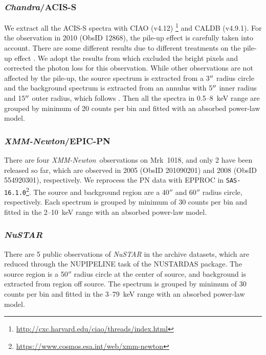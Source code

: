 \documentclass[twocolumn]{aastex63}
\newcommand{\xmm}{{\em XMM-Newton}}
\newcommand{\nustar}{{\em NuSTAR }}
\newcommand{\chandra}{{\em Chandra}}
\begin{document}
\subsubsection{\chandra/ACIS-S}
We extract all the ACIS-S spectra with CIAO (v4.12) \footnote{\url{http://cxc.harvard.edu/ciao/threads/index.html}} and {\scriptsize CALDB} (v4.9.1). For the observation in 2010 (ObsID 12868), the pile-up effect is carefully taken into account. There are some different results due to different treatments on the pile-up effect \citep[see ][]{2016A&A...593L...9H,2017ApJ...840...11L,2017A&A...607L...9K}. We adopt the results from \citet{2016A&A...593L...9H} which excluded the bright pixels and corrected the photon loss for this observation. While other observations are not affected by the pile-up, the source spectrum is extracted from a 3$\mbox{$^{\prime\prime}$}$ radius circle and the background spectrum is extracted from an annulus with 5$\mbox{$^{\prime\prime}$}$ inner radius and 15$\mbox{$^{\prime\prime}$}$ outer radius, which follows \citet{2017ApJ...840...11L}. Then all the spectra in 0.5--8~keV range are grouped by minimum of 20 counts per bin and fitted with an absorbed power-law model. 



\subsubsection{\xmm/EPIC-PN }
There are four \xmm \, observations on Mrk~1018, and only 2 have been released so far, which are observed in 2005 (ObsID 201090201) and 2008 (ObsID 554920301), respectively. We reprocess the PN data with {\scriptsize EPPROC} in \texttt{SAS-16.1.0}\footnote{\url{https://www.cosmos.esa.int/web/xmm-newton}}. The source and background region are a 40$''$ and 60$''$ radius circle, respectively. Each spectrum is grouped by minimum of 30 counts per bin and fitted in the 2--10~keV range with an absorbed power-law model. 



\subsubsection{\nustar\,}
There are 5 public observations of \nustar in the archive datasets, which are reduced through the {\scriptsize NUPIPELINE} task of the {\scriptsize NUSTARDAS} package. The source region is a 50$''$ radius circle at the center of source, and background is extracted from region off source. The spectrum is grouped by minimum of 30 counts per bin and fitted in the 3--79~keV range with an absorbed power-law model.
\end{document}
